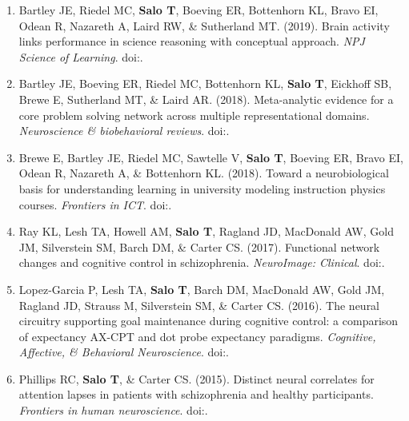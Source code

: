 \documentclass[10pt]{article}
\newcommand{\textlink}[3][blue]{\href{#2}{\color{#1}{#3}}}
\begin{document}
\begin{enumerate}
	\item Bartley JE, Riedel MC, \textbf{Salo T}, Boeving ER, Bottenhorn KL, Bravo EI, Odean R, Nazareth A, Laird RW, \& Sutherland MT.
	(2019).
	Brain activity links performance in science reasoning with conceptual approach.
	\emph{NPJ Science of Learning}.
	doi:\textlink{https://doi.org/10.1038/s41539-019-0059-8}{10.1038/s41539-019-0059-8}.

	\item Bartley JE, Boeving ER, Riedel MC, Bottenhorn KL, \textbf{Salo T}, Eickhoff SB, Brewe E, Sutherland MT, \& Laird AR.
	(2018).
	Meta-analytic evidence for a core problem solving network across multiple representational domains.
	\emph{Neuroscience \& biobehavioral reviews}.
	doi:\textlink{https://doi.org/10.1016/j.neubiorev.2018.06.009}{10.1016/j.neubiorev.2018.06.009}.

	\item Brewe E, Bartley JE, Riedel MC, Sawtelle V, \textbf{Salo T}, Boeving ER, Bravo EI, Odean R, Nazareth A, \& Bottenhorn KL.
	(2018).
	Toward a neurobiological basis for understanding learning in university modeling instruction physics courses.
	\emph{Frontiers in ICT}.
	doi:\textlink{https://doi.org/10.3389/fict.2018.00010}{10.3389/fict.2018.00010}.

	\item Ray KL, Lesh TA, Howell AM, \textbf{Salo T}, Ragland JD, MacDonald AW, Gold JM, Silverstein SM, Barch DM, \& Carter CS.
	(2017).
	Functional network changes and cognitive control in schizophrenia.
	\emph{NeuroImage: Clinical}.
	doi:\textlink{https://doi.org/10.1016/j.nicl.2017.05.001}{10.1016/j.nicl.2017.05.001}.

	\item Lopez-Garcia P, Lesh TA, \textbf{Salo T}, Barch DM, MacDonald AW, Gold JM, Ragland JD, Strauss M, Silverstein SM, \& Carter CS.
	(2016).
	The neural circuitry supporting goal maintenance during cognitive control: a comparison of expectancy AX-CPT and dot probe expectancy paradigms.
	\emph{Cognitive, Affective, \& Behavioral Neuroscience}.
	doi:\textlink{https://doi.org/10.3758/s13415-015-0384-1}{10.3758/s13415-015-0384-1}.

	\item Phillips RC, \textbf{Salo T}, \& Carter CS. (2015).
	Distinct neural correlates for attention lapses in patients with schizophrenia and healthy participants.
	\emph{Frontiers in human neuroscience}.
	doi:\textlink{https://doi.org/10.3389/fnhum.2015.00502}{10.3389/fnhum.2015.00502}.

\end{enumerate}
\end{document}
